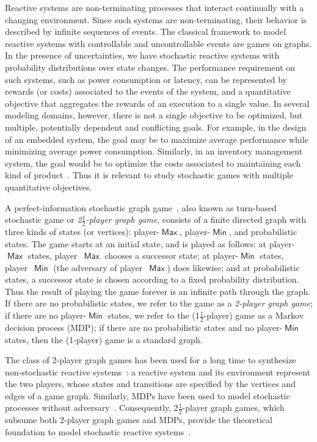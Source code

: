 \documentclass{article}
\newcommand{\half}{$\frac{\text{1}}{\text{2}}$}
\DeclareMathOperator{\ma}{\mathsf{Max}}
\DeclareMathOperator{\mi}{\mathsf{Min}}
\begin{document}
Reactive systems are non-terminating processes that interact continually with a changing environment. 
Since such systems are non-terminating, their behavior is described by infinite sequences of events.
The classical framework to model reactive systems with controllable and uncontrollable events are games on graphs. 
In the presence of uncertainties, we have stochastic reactive systems with probability distributions over state changes. 
The performance requirement on such systems, such as power consumption or latency,
can be represented by rewards (or costs) associated to the events of the system,
and a quantitative objective that aggregates the rewards of an execution to a single value.
In several modeling domains, however, there is not a single objective 
to be optimized, but multiple, potentially dependent and conflicting goals.
For example, in the design of an embedded system, the goal may be to maximize 
average performance while minimizing average power consumption.
Similarly, in an inventory management system, the goal would be to optimize
the costs associated to maintaining each kind of product~\cite{FV97,AltmanBook}. 
Thus it is relevant to study stochastic games with multiple 
quantitative objectives.

\smallskip{}
A perfect-information stochastic graph game~\cite{Condon92}, also known as turn-based stochastic 
game or \emph{2\half-player graph game}, consists of a finite directed graph with three kinds of states (or vertices): 
player-$\ma$, player-$\mi$, and probabilistic states.
The game starts at an initial state, and is played as follows: 
at player-$\ma$ states, player~$\ma$ chooses a successor state;
at player-$\mi$ states, player~$\mi$ (the adversary of player~$\ma$)  does likewise;
and at probabilistic states, a successor state 
is chosen according to a fixed probability distribution.
Thus the result of playing the game forever is an infinite path through 
the graph.
If there are no probabilistic states, we refer to the game as a 
\emph{2-player graph game}; 
if there are no player-$\mi$ states, we refer to the (1\half-player) game
as a Markov decision process (MDP);
if there are no probabilistic states and no player-$\mi$ states,
then the (1-player) game is a standard graph.

The class of 2-player graph games has been used for a long time 
to synthesize non-stochastic reactive systems~\cite{BL69,PnueliRosner,RamadgeWonham}:
a reactive system and its environment represent the two players, whose states 
and transitions are specified by the vertices and edges of a game graph.
Similarly, MDPs have been used to model stochastic processes without 
adversary~\cite{FV97,Puterman}.
Consequently, 2\half-player graph games, which subsume both 2-player 
graph games and MDPs, provide the theoretical foundation
to model stochastic reactive systems~\cite{FV97,RF91}. 
\end{document}
